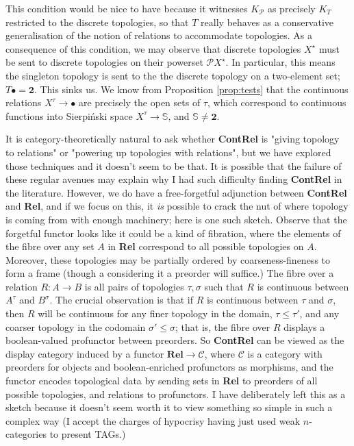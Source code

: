 \begin{marginfigure}
This condition would be nice to have because it witnesses $K_{\mathcal{P}}$ as precisely $K_T$ restricted to the discrete topologies, so that $T$ really behaves as a conservative generalisation of the notion of relations to accommodate topologies. As a consequence of this condition, we may observe that discrete topologies $X^\star$ must be sent to discrete topologies on their powerset $\mathcal{P}X^\star$. In particular, this means the singleton topology is sent to the the discrete topology on a two-element set; $T\bullet = \textbf{2}$. This sinks us. We know from Proposition \ref{prop:tests} that the continuous relations $X^\tau \rightarrow \bullet$ are precisely the open sets of $\tau$, which correspond to continuous functions into Sierpi\'{n}ski space $X^\tau \rightarrow \mathbb{S}$, and $\mathbb{S} \neq \textbf{2}$.


It is category-theoretically natural to ask whether \textbf{ContRel} is "giving topology to relations" or "powering up topologies with relations", but we have explored those techniques and it doesn't seem to be that. It is possible that the failure of these regular avenues may explain why I had such difficulty finding \textbf{ContRel} in the literature. However, we do have a free-forgetful adjunction between \textbf{ContRel} and \textbf{Rel}, and if we focus on this, it \emph{is} possible to crack the nut of where topology is coming from with enough machinery; here is one such sketch. Observe that the forgetful functor looks like it could be a kind of fibration, where the elements of the fibre over any set $A$ in \textbf{Rel} correspond to all possible topologies on $A$. Moreover, these topologies may be partially ordered by coarseness-fineness to form a frame (though a considering it a preorder will suffice.) The fibre over a relation $R: A \rightarrow B$ is all pairs of topologies $\tau, \sigma$ such that $R$ is continuous between $A^\tau$ and $B^\sigma$. The crucial observation is that if $R$ is continuous between $\tau$ and $\sigma$, then $R$ will be continuous for any finer topology in the domain, $\tau \leq \tau'$, and any coarser topology in the codomain $\sigma' \leq \sigma$; that is, the fibre over $R$ displays a boolean-valued profunctor between preorders. So \textbf{ContRel} can be viewed as the display category induced by a functor $\textbf{Rel} \rightarrow \mathcal{C}$, where $\mathcal{C}$ is a category with preorders for objects and boolean-enriched profunctors as morphisms, and the functor encodes topological data by sending sets in \textbf{Rel} to preorders of all possible topologies, and relations to profunctors. I have deliberately left this as a sketch because it doesn't seem worth it to view something so simple in such a complex way (I accept the charges of hypocrisy having just used weak $n$-categories to present TAGs.)


\end{marginfigure}
